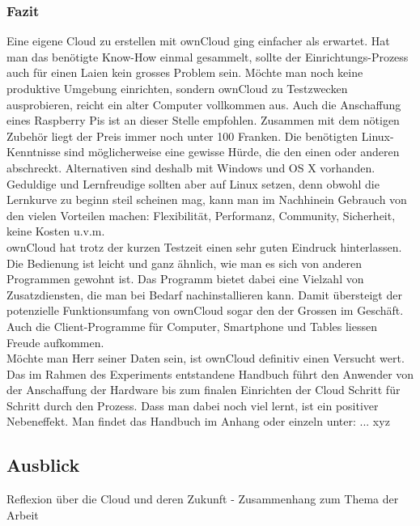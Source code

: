 \subsubsection{Fazit}
Eine eigene Cloud zu erstellen mit ownCloud ging einfacher als erwartet. Hat man das benötigte Know-How einmal gesammelt, sollte der Einrichtungs-Prozess auch für einen Laien kein grosses Problem sein. Möchte man noch keine produktive Umgebung einrichten, sondern ownCloud zu Testzwecken ausprobieren, reicht ein alter Computer vollkommen aus. Auch die Anschaffung eines Raspberry Pis ist an dieser Stelle empfohlen. Zusammen mit dem nötigen Zubehör liegt der Preis immer noch unter 100 Franken. Die benötigten Linux-Kenntnisse sind möglicherweise eine gewisse Hürde, die den einen oder anderen abschreckt. Alternativen sind deshalb mit Windows und OS X vorhanden. Geduldige und Lernfreudige sollten aber auf Linux setzen, denn obwohl die Lernkurve zu beginn steil scheinen mag, kann man im Nachhinein Gebrauch von den vielen Vorteilen machen: Flexibilität, Performanz, Community, Sicherheit, keine Kosten u.v.m.
\\
ownCloud hat trotz der kurzen Testzeit einen sehr guten Eindruck hinterlassen. Die Bedienung ist leicht und ganz ähnlich, wie man es sich von anderen Programmen gewohnt ist. Das Programm bietet dabei eine Vielzahl von Zusatzdiensten, die man bei Bedarf nachinstallieren kann. Damit übersteigt der potenzielle Funktionsumfang von ownCloud sogar den der Grossen im Geschäft. Auch die Client-Programme für Computer, Smartphone und Tables liessen Freude aufkommen.
\\
Möchte man Herr seiner Daten sein, ist ownCloud definitiv einen Versucht wert. Das im Rahmen des Experiments entstandene Handbuch führt den Anwender von der Anschaffung der Hardware bis zum finalen Einrichten der Cloud Schritt für Schritt durch den Prozess. Dass man dabei noch viel lernt, ist ein positiver Nebeneffekt.
Man findet das Handbuch im Anhang oder einzeln unter: ... xyz


\subsection{Ausblick}
Reflexion über die Cloud und deren Zukunft - Zusammenhang zum Thema der Arbeit
